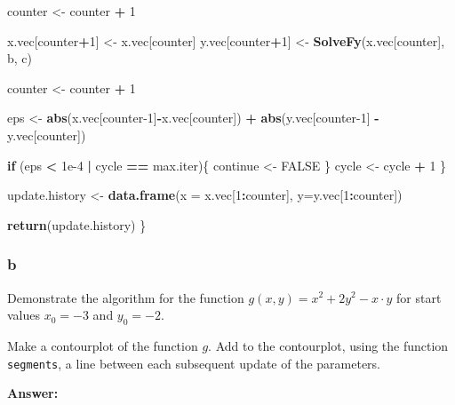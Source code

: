 \documentclass[]{article}
\newenvironment{Shaded}{\begin{snugshade}}{\end{snugshade}}
\newcommand{\ControlFlowTok}[1]{\textcolor[rgb]{0.13,0.29,0.53}{\textbf{#1}}}
\newcommand{\DataTypeTok}[1]{\textcolor[rgb]{0.13,0.29,0.53}{#1}}
\newcommand{\DecValTok}[1]{\textcolor[rgb]{0.00,0.00,0.81}{#1}}
\newcommand{\FloatTok}[1]{\textcolor[rgb]{0.00,0.00,0.81}{#1}}
\newcommand{\KeywordTok}[1]{\textcolor[rgb]{0.13,0.29,0.53}{\textbf{#1}}}
\newcommand{\NormalTok}[1]{#1}
\newcommand{\OperatorTok}[1]{\textcolor[rgb]{0.81,0.36,0.00}{\textbf{#1}}}
\newcommand{\OtherTok}[1]{\textcolor[rgb]{0.56,0.35,0.01}{#1}}
\newcommand{\StringTok}[1]{\textcolor[rgb]{0.31,0.60,0.02}{#1}}
\begin{document}
\begin{Shaded}
\begin{Highlighting}[]
\NormalTok{    counter <-}\StringTok{ }\NormalTok{counter }\OperatorTok{+}\StringTok{ }\DecValTok{1}
    
\NormalTok{    x.vec[counter}\OperatorTok{+}\DecValTok{1}\NormalTok{] <-}\StringTok{ }\NormalTok{x.vec[counter]}
\NormalTok{    y.vec[counter}\OperatorTok{+}\DecValTok{1}\NormalTok{] <-}\StringTok{ }\KeywordTok{SolveFy}\NormalTok{(x.vec[counter], b, c)}
    
\NormalTok{    counter <-}\StringTok{ }\NormalTok{counter }\OperatorTok{+}\StringTok{ }\DecValTok{1}
    
\NormalTok{    eps <-}\StringTok{ }\KeywordTok{abs}\NormalTok{(x.vec[counter}\DecValTok{-1}\NormalTok{]}\OperatorTok{-}\NormalTok{x.vec[counter]) }\OperatorTok{+}\StringTok{ }\KeywordTok{abs}\NormalTok{(y.vec[counter}\DecValTok{-1}\NormalTok{] }\OperatorTok{-}\StringTok{ }\NormalTok{y.vec[counter])}
    
    \ControlFlowTok{if}\NormalTok{ (eps }\OperatorTok{<}\StringTok{ }\FloatTok{1e-4} \OperatorTok{|}\StringTok{ }\NormalTok{cycle }\OperatorTok{==}\StringTok{ }\NormalTok{max.iter)\{}
\NormalTok{      continue <-}\StringTok{ }\OtherTok{FALSE}
\NormalTok{    \}}
\NormalTok{    cycle <-}\StringTok{ }\NormalTok{cycle }\OperatorTok{+}\StringTok{ }\DecValTok{1}
\NormalTok{  \}}
  
\NormalTok{  update.history <-}\StringTok{ }\KeywordTok{data.frame}\NormalTok{(}\DataTypeTok{x =}\NormalTok{ x.vec[}\DecValTok{1}\OperatorTok{:}\NormalTok{counter], }\DataTypeTok{y=}\NormalTok{y.vec[}\DecValTok{1}\OperatorTok{:}\NormalTok{counter])}
  
  \KeywordTok{return}\NormalTok{(update.history)}
\NormalTok{\}}
\end{Highlighting}
\end{Shaded}

\hypertarget{b-11}{%
\subsubsection{b}\label{b-11}}

Demonstrate the algorithm for the function
\(g(x, y) = x^2 + 2y^2 - x\cdot y\) for start values \(x_0 = -3\) and
\(y_0 = -2\).

Make a contourplot of the function \(g\). Add to the contourplot, using
the function \texttt{segments}, a line between each subsequent update of
the parameters.

\textbf{Answer:}
\end{document}
